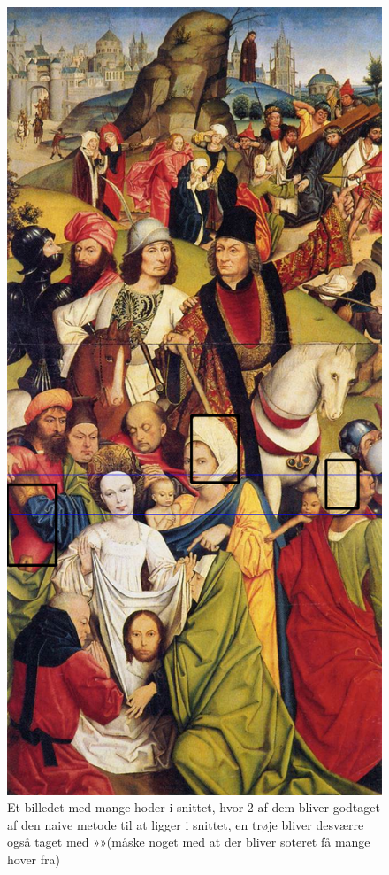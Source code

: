 \begin{figure}[h!!]
	\begin{center}
		\includegraphics[scale=0.3,angle=0]{afsnit/afprovning/billeder/naive_losning/naiv_kfarver_kdetaljer.png}
	\end{center}
	\caption[]{Et billedet med mange hoder i snittet, hvor 2 af dem bliver godtaget af den naive metode til at ligger i snittet, en trøje bliver desværre også taget med »»(måske noget med at der bliver soteret få mange hover fra)}
	\label{naiv_kfarver_kdetaljer}
\end{figure}

